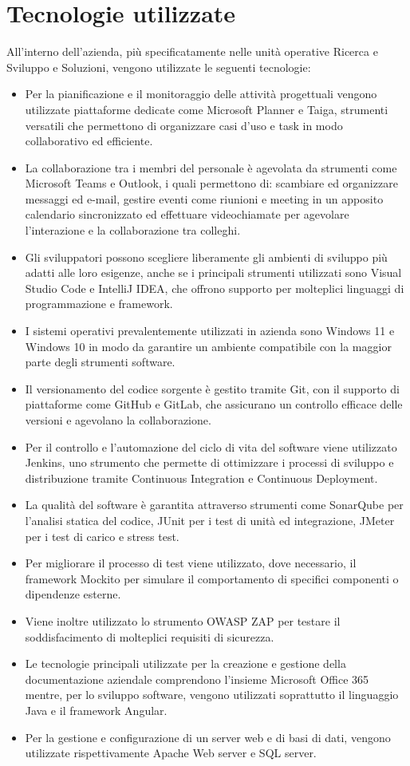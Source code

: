 \section{Tecnologie utilizzate}
All'interno dell'azienda, più specificatamente nelle unità operative Ricerca e Sviluppo e Soluzioni, vengono utilizzate le seguenti tecnologie: 
\begin{itemize}
    \item Per la pianificazione e il monitoraggio delle attività progettuali vengono utilizzate piattaforme dedicate come Microsoft Planner e Taiga, strumenti versatili che permettono di organizzare casi d'uso e task in modo collaborativo ed efficiente. 
    \item La collaborazione tra i membri del personale è agevolata da strumenti come Microsoft Teams e Outlook, i quali permettono di: scambiare ed organizzare messaggi ed e-mail, gestire eventi come riunioni e meeting in un apposito calendario sincronizzato ed effettuare videochiamate per agevolare l'interazione e la collaborazione tra colleghi. 
    \item Gli sviluppatori possono scegliere liberamente gli ambienti di sviluppo più adatti alle loro esigenze, anche se i principali strumenti utilizzati sono Visual Studio Code e IntelliJ IDEA, che offrono supporto per molteplici linguaggi di programmazione e framework. 
    \item I sistemi operativi prevalentemente utilizzati in azienda sono Windows 11 e Windows 10 in modo da garantire un ambiente compatibile con la maggior parte degli strumenti software. 
    \item Il versionamento del codice sorgente è gestito tramite Git, con il supporto di piattaforme come GitHub e GitLab, che assicurano un controllo efficace delle versioni e agevolano la collaborazione. 
    \item Per il controllo e l'automazione del ciclo di vita del software viene utilizzato Jenkins, uno strumento che permette di ottimizzare i processi di sviluppo e distribuzione tramite Continuous Integration e Continuous Deployment. 
    \item La qualità del software è garantita attraverso strumenti come SonarQube per l'analisi statica del codice, JUnit per i test di unità ed integrazione, JMeter per i test di carico e stress test. 
    \item Per migliorare il processo di test viene utilizzato, dove necessario, il framework Mockito per simulare il comportamento di specifici componenti o dipendenze esterne. 
    \item Viene inoltre utilizzato lo strumento OWASP ZAP per testare il soddisfacimento di molteplici requisiti di sicurezza. 
    \item Le tecnologie principali utilizzate per la creazione e gestione della documentazione aziendale comprendono l'insieme Microsoft Office 365 mentre, per lo sviluppo software, vengono utilizzati soprattutto il linguaggio Java e il framework Angular. 
    \item Per la gestione e configurazione di un server web e di basi di dati, vengono utilizzate rispettivamente Apache Web server e SQL server. 
\end{itemize}

